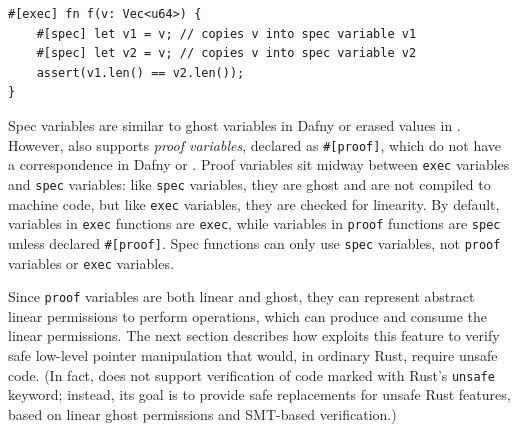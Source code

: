 \begin{lstlisting}[language=Verus]
#[exec] fn f(v: Vec<u64>) {
    #[spec] let v1 = v; // copies v into spec variable v1
    #[spec] let v2 = v; // copies v into spec variable v2
    assert(v1.len() == v2.len());
}
\end{lstlisting}

Spec variables are similar to ghost variables in Dafny or erased values in \fstar.
However, \verus also supports {\it proof variables}, declared as \verb`#[proof]`,
which do not have a correspondence in Dafny or \fstar.
Proof variables sit midway between \verb`exec` variables and \verb`spec` variables:
like \verb`spec` variables, they are ghost and are not compiled to machine code,
but like \verb`exec` variables, they are checked for linearity.
By default, variables in \verb`exec` functions are \verb`exec`,
while variables in \verb`proof` functions are \verb`spec` unless declared \verb`#[proof]`.
Spec functions can only use \verb`spec` variables, not \verb`proof` variables or \verb`exec` variables.

Since \verb`proof` variables are both linear and ghost,
they can represent abstract linear permissions to perform operations,
which can produce and consume the linear permissions.
The next section describes how \verus exploits this feature to verify
safe low-level pointer manipulation that would, in ordinary Rust, require unsafe code.
(In fact, \verus does not support verification of code marked with Rust's \verb`unsafe` keyword;
instead, its goal is to provide safe replacements for unsafe Rust features,
based on linear ghost permissions and SMT-based verification.)




